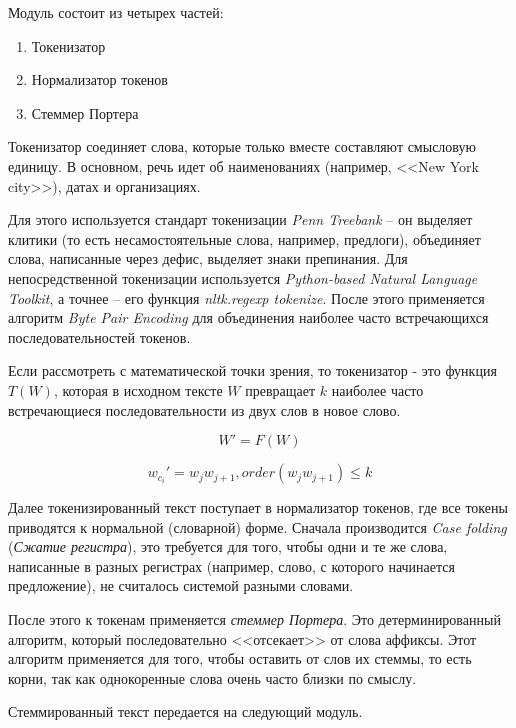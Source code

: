 \documentclass[a4paper,12pt,preview]{report} %
\begin{document}
	Модуль состоит из четырех частей:
	\begin{enumerate}
		\item Токенизатор
		\item Нормализатор токенов
		\item Стеммер Портера
	\end{enumerate}
	
	Токенизатор соединяет слова, которые только вместе составляют смысловую единицу. В основном, речь идет об наименованиях (например, <<New York city>>), датах и организациях. 
	
	Для этого используется стандарт токенизации \textit{Penn Treebank} -- он выделяет клитики (то есть несамостоятельные слова, например, предлоги), объединяет слова, написанные через дефис, выделяет знаки препинания. Для непосредственной токенизации используется \textit{Python-based Natural Language Toolkit}, а точнее -- его функция  \textit{nltk.regexp tokenize}. После этого применяется алгоритм \textit{Byte Pair Encoding} для объединения наиболее часто встречающихся последовательностей токенов.
	
	Если рассмотреть с математической точки зрения, то токенизатор - это функция $T(W)$, которая в исходном тексте $W$ превращает $k$ наиболее часто встречающиеся последовательности из двух слов в новое слово.
	
	\begin{equation}
	W' = F(W)
	\end{equation}
	
	\begin{equation}
	w_{c_i}' = w_jw_{j+1}, order(w_jw_{j+1}) \leq k 
	\end{equation}
	
	Далее токенизированный текст поступает в нормализатор токенов, где все токены приводятся к нормальной (словарной) форме. Сначала производится \textit{Case folding} (\textit{Сжатие регистра}), это требуется для того, чтобы одни и те же слова, написанные в разных регистрах (например, слово, с которого начинается предложение), не считалось системой разными словами. 
	
	После этого к токенам применяется \textit{стеммер Портера}. Это детерминированный алгоритм, который последовательно <<отсекает>> от слова аффиксы. Этот алгоритм применяется для того, чтобы оставить от слов их стеммы, то есть корни, так как однокоренные слова очень часто близки по смыслу.
	
	Стеммированный текст передается на следующий модуль.
	
\end{document}
